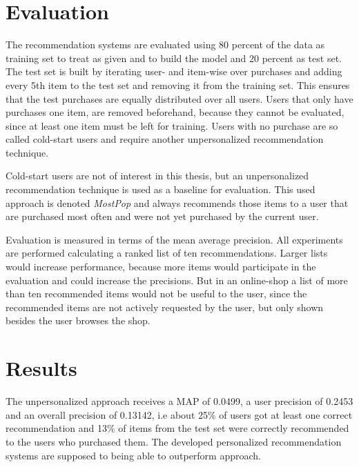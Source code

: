 \documentclass[10pt]{reportMaster}
\begin{document}
\section{Evaluation}
\label{sec:eval}
The recommendation systems are evaluated using 80 percent of the data as training set to treat as given and to build the model and 20 percent as test set.
The test set is built by iterating user- and item-wise over purchases and adding every 5th item to the test set and removing it from the training set.
This ensures that the test purchases are equally distributed over all users.
Users that only have purchases one item, are removed beforehand, because they cannot be evaluated, since at least one item must be left for training.
Users with no purchase are so called cold-start users and require another unpersonalized recommendation technique.

Cold-start users are not of interest in this thesis, but an unpersonalized recommendation technique is used as a baseline for evaluation.
This used approach is denoted \textit{MostPop} and always recommends those items to a user that are purchased most often and were not yet purchased by the current user.


Evaluation is measured in terms of the mean average precision.
All experiments are performed calculating a ranked list of ten recommendations.
Larger lists would increase performance, because more items would participate in the evaluation and could increase the precisions. %
But in an online-shop a list of more than ten recommended items would not be useful to the user, since the recommended items are not actively requested by the user, but only shown besides the user browses the shop.

\section{Results}
The unpersonalized approach receives a MAP of 0.0499, a user precision of 0.2453 and an overall precision of 0.13142, i.e about 25\% of users got at least one correct recommendation and 13\% of items from the test set were correctly recommended to the users who purchased them.
The developed personalized recommendation systems are supposed to being able to outperform approach.
\end{document}

